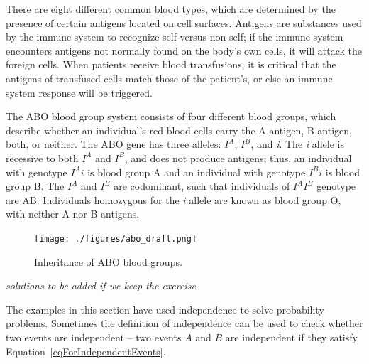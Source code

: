 \begin{exercise} \label{exABOBloodGroups}

There are eight different common blood types, which are determined by the presence of certain antigens located on cell surfaces. Antigens are substances used by the immune system to recognize self versus non-self; if the immune system encounters antigens not normally found on the body's own cells, it will attack the foreign cells. When patients receive blood transfusions, it is critical that the antigens of transfused cells match those of the patient's, or else an immune system response will be triggered.

The ABO blood group system consists of four different blood groups, which describe whether an individual's red blood cells carry the A antigen, B antigen, both, or neither. The ABO gene has three alleles: ${I}^{A}$, ${I}^{B}$, and \textit{i}. The \textit{i} allele is recessive to both ${I}^{A}$ and ${I}^{B}$, and does not produce antigens; thus, an individual with genotype ${I}^{A}i$ is blood group A and an individual with genotype ${I}^{B}i$ is blood group B. The ${I}^{A}$ and ${I}^{B}$ are codominant, such that individuals of ${I}^{A}$${I}^{B}$ genotype are AB. Individuals homozygous for the \textit{i} allele are known as blood group O, with neither A nor B antigens.

\begin{figure}[h]
	\centering
	\texttt{[image: ./figures/abo\_draft.png]}
	\caption{Inheritance of ABO blood groups.}
	\label{fig:aboInheritance}
\end{figure}


    \textit{solutions to be added if we keep the exercise}
  
  \end{exercise}


The examples in this section have used independence to solve probability problems.  Sometimes the definition of independence can be used to check whether two events are independent -- two events $A$ and $B$ are independent if they satisfy Equation~\eqref{eqForIndependentEvents}.

